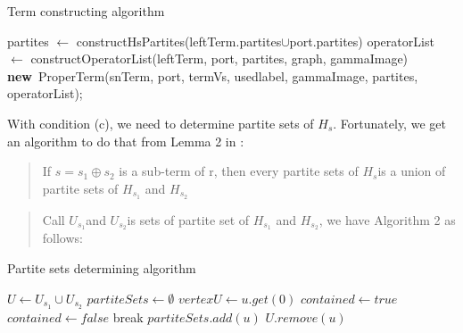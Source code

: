 \documentclass[a4paper, 12pt]{article}
\begin{document}
\begin{algorithm}
\caption{Term constructing algorithm}
\begin{algorithmic}[1]
	\Else
	\EndIf
	\State partites {$\gets$} constructHsPartites(leftTerm.partites{$\cup$}port.partites)
	\State operatorList {$\gets$} constructOperatorList(leftTerm, port,
                partites, graph, gammaImage)\linebreak
	\State \Return \textbf{new}\ ProperTerm(snTerm, port, termVs, usedlabel,
                gammaImage, partites, operatorList);
\EndFunction
\end{algorithmic}

\end{algorithm}
With condition (c), we need to determine partite sets of \textit {$H_{s}$}. Fortunately, we get an algorithm to do that from Lemma 2 in \cite {vadim-lozin} : 

\begin{quotation}
If $s=s_{1}\oplus s_{2}$ is a sub-term of r, then every partite sets of \textit {$H_{s}$}is a union of partite sets of $H_{s_{1}}$ and $H_{s_{2}}$ 
\end{quotation}

\begin{quotation}
Call $U_{s_{1}}$and $U_{s_{2}}$is sets of partite set of $H_{s_{1}}$ and $H_{s_{2}}$, we have Algorithm 2 as follows:
\end{quotation}

\begin{algorithm}[H]
\caption{Partite sets determining algorithm}
\begin{algorithmic}[1]
	\State $U\gets U_{s_{1}} \cup U_{s_{2}}$ 
		\State $partiteSets\leftarrow\emptyset$ 
			\State $vertexU\gets u.get(0)$
				\State $contained\gets true$
					\State $contained\gets false$
					\State break
				\EndIf
			\EndFor
				\State $partiteSets.add(u)$
				\State $U.remove(u)$
			\EndIf
		\EndFor
	\EndWhile 
\end{algorithmic}
\end{algorithm}
\end{document}
